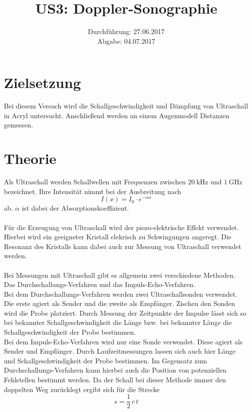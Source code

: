 \documentclass[
  bibliography=totoc,     %
  captions=tableheading,  %
  titlepage=firstiscover, %
]{scrartcl}
\title{US3: Doppler-Sonographie}
\author{
  Simon Schulte
  \texorpdfstring{
    \\
    \href{mailto:simon.schulte@udo.edu}{simon.schulte@udo.edu}
  }{}
  \texorpdfstring{\and}{, }
  Tim Sedlaczek
  \texorpdfstring{
    \\
    \href{mailto:tim.sedlaczek@udo.edu}{tim.sedlaczek@udo.edu}
  }{}
}
\date{Durchführung: 27.06.2017\\
      Abgabe: 04.07.2017}
\begin{document}
\maketitle
\thispagestyle{empty}
\tableofcontents
\newpage
\setcounter{page}{1}
\section{Zielsetzung}
\label{sec:zielsetzung}
Bei diesem Versuch wird die Schallgeschwindigkeit und Dämpfung von Ultraschall
in Acryl untersucht. Anschließend werden an einem Augenmodell Distanzen gemessen.
\section{Theorie}
\label{sec:theorie}
Als Ultraschall werden Schallwellen mit Frequenzen zwischen $\SI{20}{\kilo\hertz}$
und $\SI{1}{\giga\hertz}$ bezeichnet.
Ihre Intensität nimmt bei der Ausbreitung nach
\begin{equation}
  I \left( x \right) = I_0 \cdot e^{-\alpha x}
  \label{eqn:dämpfung}
\end{equation}
ab. $\alpha$ ist dabei der Absorptionskoeffizient.\\
\\
\noindent
Für die Erzeugung von Ultraschall wird der piezo-elektrische Effekt verwendet.
Hierbei wird ein geeigneter Kristall elekrisch zu Schwingungen angeregt.
Die Resonanz des Kristalls kann dabei auch zur Messung von Ultraschall verwendet
werden.\\
\\
\noindent
Bei Messungen mit Ultraschall gibt es allgemein zwei verschiedene Methoden.
Das Durchschallungs-Verfahren und das Impuls-Echo-Verfahren.\\
Bei dem Durchschallungs-Verfahren werden zwei Ultraschallsonden verwendet.
Die erste agiert als Sender und die zweite als Empfänger. Zischen den
Sonden wird die Probe platziert. Durch Messung der Zeitpunkte der Impulse
lässt sich so bei bekannter Schallgeschwindigkeit die Länge bzw. bei bekannter
Länge die Schallgeschwindigkeit der Probe bestimmen.\\
Bei dem Impuls-Echo-Verfahren wird nur eine Sonde verwendet. Diese agiert
als Sender und Empfänger. Durch Laufzeitmessungen lassen sich auch hier
Länge und Schallgeschwindigkeit der Probe bestimmen. Im Gegensatz zum
Durchschallungs-Verfahren kann hierbei auch die Position von potenziellen
Fehlstellen bestimmt werden.
Da der Schall bei dieser Methode immer den doppelten Weg zurücklegt ergibt sich
für die Strecke
\begin{equation}
  s = \frac{1}{2}\,c\,t
  \label{eqn:strecke}
\end{equation}
\clearpage
\end{document}
